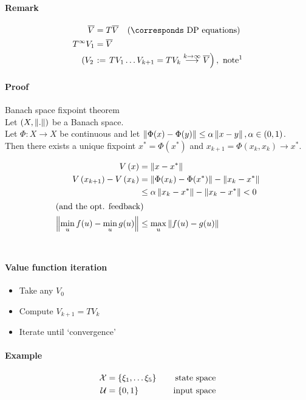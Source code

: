 \paragraph{Remark}
\begin{align*}
\Vbar{} &= T\Vbar{} \quad ( \corresponds \txt{ DP equations})\\
T^\infty V_1 &= \Vbar{}\\
\left( V_2 \right. &:= \left. TV_1 \dots V_{k+1} = TV_k
    \overset{k \rightarrow \infty}{\longrightarrow}
    \Vbar{} \right),\txt{ note\footnotemark}
\end{align*}

\paragraph{Proof}
Banach space fixpoint theorem\\
Let $\left( X, \left\lVert . \right\rVert \right)$ be a Banach space.\\
Let $\Phi: X \rightarrow X$ be continuous and let
$\left\lVert \Phi(x) - \Phi(y) \right\rVert \leq \alpha \left\lVert x - y \right\rVert, \alpha \in (0,1)$.\\
Then there exists a unique fixpoint $x^* = \Phi(x^*)$ and $x_{k+1} = \Phi(x_k, x_k) \rightarrow x^*$.

\begin{align*}
V \left( x \right) &= \left\lVert x - x^* \right\rVert\\
V \left( x_{k+1} \right) - V \left( x_k \right)
    &= \left\lVert \Phi(x_k) - \Phi(x^*) \right\rVert - \left\lVert x_k - x^* \right\rVert\\
    &\leq \alpha \left\lVert x_k - x^* \right\rVert - \left\lVert x_k - x^* \right\rVert
    < 0\\
    \intertext{(and the opt. feedback)}
\left\lVert \min_{u} f(u) - \min_{u} g(u) \right\rVert
    &\leq \max_u \left\lVert f(u) - g(u) \right\rVert
\end{align*}~

\paragraph{Value function iteration}
\begin{itemize}
\item Take any $V_0$
\item Compute $V_{k+1} = TV_k$
\item Iterate until `convergence'
\end{itemize}

\paragraph{Example}
\begin{align*}
\setX{} &= \set{\xi_1, \dots \xi_5} &\quad \txt{state space}\\
\setU{} &= \set{0,1}    &\quad \txt{input space}
\end{align*}~ 

